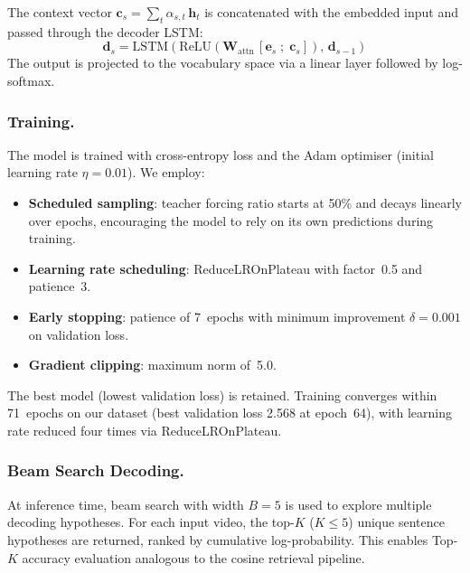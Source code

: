 \documentclass[runningheads]{llncs}
\begin{document}
The context vector $\mathbf{c}_s = \sum_t \alpha_{s,t}\,\mathbf{h}_t$
is concatenated with the embedded input and passed through the decoder
LSTM:
\begin{equation}
\mathbf{d}_s = \mathrm{LSTM}(\mathrm{ReLU}(
  \mathbf{W}_{\text{attn}}\,[\mathbf{e}_s \;;\; \mathbf{c}_s]),
  \,\mathbf{d}_{s-1})
\label{eq:decoder_step}
\end{equation}
The output is projected to the vocabulary space via a linear layer
followed by log-softmax.

\subsubsection{Training.}\label{sec:training}

The model is trained with cross-entropy loss and the Adam optimiser
(initial learning rate $\eta = 0.01$).
We employ:
\begin{itemize}
    \item \textbf{Scheduled sampling}: teacher forcing ratio starts at
          50\% and decays linearly over epochs, encouraging the model to
          rely on its own predictions during training.
    \item \textbf{Learning rate scheduling}: ReduceLROnPlateau with
          factor~0.5 and patience~3.
    \item \textbf{Early stopping}: patience of 7~epochs with minimum
          improvement $\delta = 0.001$ on validation loss.
    \item \textbf{Gradient clipping}: maximum norm of~5.0.
\end{itemize}
The best model (lowest validation loss) is retained.
Training converges within 71~epochs on our dataset (best validation
loss 2.568 at epoch~64), with learning rate reduced four times via
ReduceLROnPlateau.

\subsubsection{Beam Search Decoding.}\label{sec:beam}

At inference time, beam search with width $B = 5$ is used to explore
multiple decoding hypotheses.
For each input video, the top-$K$ ($K \leq 5$) unique sentence
hypotheses are returned, ranked by cumulative log-probability.
This enables Top-$K$ accuracy evaluation analogous to the cosine
retrieval pipeline.
\end{document}
